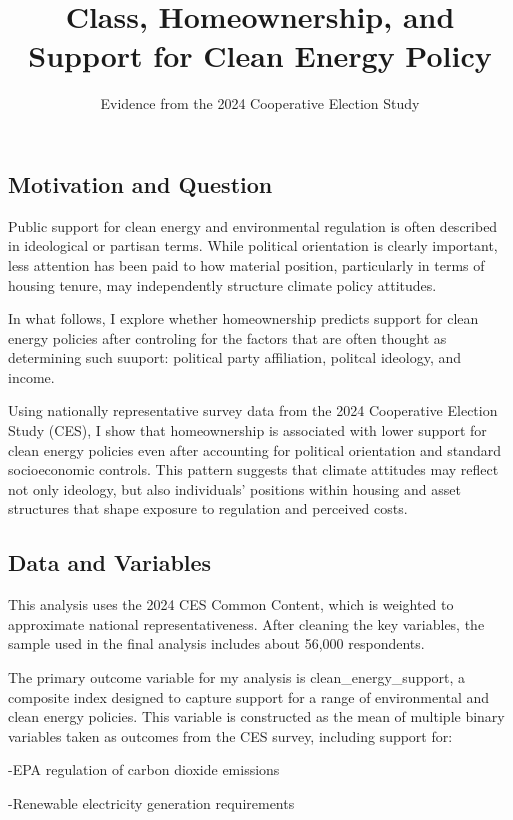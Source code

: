 \documentclass[
  letterpaper,
  DIV=11,
  numbers=noendperiod]{scrartcl}
\title{Class, Homeownership, and Support for Clean Energy Policy}
\subtitle{Evidence from the 2024 Cooperative Election Study}
\author{}
\date{}
\begin{document}
\maketitle


\subsection{Motivation and Question}\label{motivation-and-question}

Public support for clean energy and environmental regulation is often
described in ideological or partisan terms. While political orientation
is clearly important, less attention has been paid to how material
position, particularly in terms of housing tenure, may independently
structure climate policy attitudes.

In what follows, I explore whether homeownership predicts support for
clean energy policies after controling for the factors that are often
thought as determining such suuport: political party affiliation,
politcal ideology, and income.

Using nationally representative survey data from the 2024 Cooperative
Election Study (CES), I show that homeownership is associated with lower
support for clean energy policies even after accounting for political
orientation and standard socioeconomic controls. This pattern suggests
that climate attitudes may reflect not only ideology, but also
individuals' positions within housing and asset structures that shape
exposure to regulation and perceived costs.

\subsection{Data and Variables}\label{data-and-variables}

This analysis uses the 2024 CES Common Content, which is weighted to
approximate national representativeness. After cleaning the key
variables, the sample used in the final analysis includes about 56,000
respondents.

The primary outcome variable for my analysis is clean\_energy\_support,
a composite index designed to capture support for a range of
environmental and clean energy policies. This variable is constructed as
the mean of multiple binary variables taken as outcomes from the CES
survey, including support for:

-EPA regulation of carbon dioxide emissions

-Renewable electricity generation requirements
\end{document}
